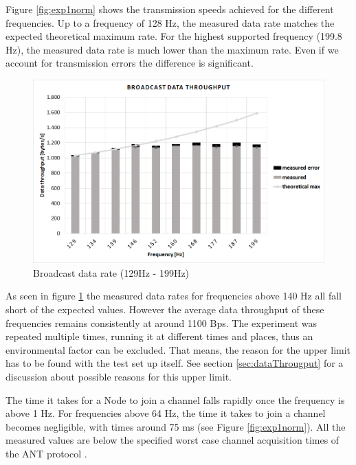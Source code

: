 \begin{description}
	Figure \ref{fig:exp1norm} shows the transmission speeds achieved for the different frequencies. Up to a frequency of 128 Hz, the measured data rate matches the expected theoretical maximum rate. For the highest supported frequency (199.8 Hz), the measured data rate is much lower than the maximum rate. Even if we account for transmission errors the difference is significant. 
	\begin{figure}[H]
		\centering
		\includegraphics[scale=0.5]{content/images/exp1_detail.png}
		\caption{Broadcast data rate (129Hz - 199Hz)}\label{fig:exp1between}
	\end{figure}
	As seen in figure \ref{fig:exp1between} the measured data rates for frequencies above 140 Hz all fall short of the expected values. However the average data throughput of these frequencies remains consistently at around 1100 Bps. The experiment was repeated multiple times, running it at different times and places, thus an environmental factor can be excluded. That means, the reason for the upper limit has to be found with the test set up itself. See section \ref{sec:dataThrougput} for a discussion about possible reasons for this upper limit.
	
	The time it takes for a Node to join a channel falls rapidly once the frequency is above 1 Hz. For frequencies above 64 Hz, the time it takes to join a channel becomes negligible, with times around 75 ms (see Figure \ref{fig:exp1norm}). All the measured values are below the specified worst case channel acquisition times of the ANT protocol \cite{AntChan}.
	

\end{description}

